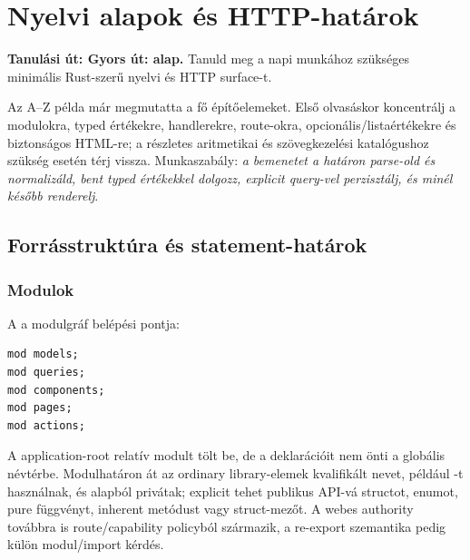 \chapter{Nyelvi alapok és HTTP-határok}

\noindent\textbf{Tanulási út: Gyors út: alap.} Tanuld meg a napi munkához szükséges minimális Rust-szerű nyelvi és HTTP surface-t.\par\medskip



Az A--Z példa már megmutatta a fő építőelemeket. Első olvasáskor koncentrálj a modulokra, typed értékekre, handlerekre, route-okra, opcionális/listaértékekre és biztonságos HTML-re; a részletes aritmetikai és szövegkezelési katalógushoz szükség esetén térj vissza. Munkaszabály: \emph{a bemenetet a határon parse-old és normalizáld, bent typed értékekkel dolgozz, explicit query-vel perzisztálj, és minél később renderelj}.

\section{Forrásstruktúra és statement-határok}

\subsection*{Modulok}

A  a modulgráf belépési pontja:

\begin{lstlisting}[language=Velran]
mod models;
mod queries;
mod components;
mod pages;
mod actions;
\end{lstlisting}

A  application-root relatív modult tölt be, de a deklarációit nem önti a globális névtérbe. Modulhatáron át az ordinary library-elemek kvalifikált nevet, például -t használnak, és alapból privátak; explicit  tehet publikus API-vá structot, enumot, pure függvényt, inherent metódust vagy struct-mezőt. A webes authority továbbra is route/capability policyból származik, a  re-export szemantika pedig külön modul/import kérdés.

